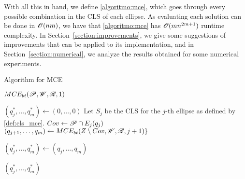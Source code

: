 With all this in hand, we define \autoref{algoritmo:mce}, which goes through every possible combination in the CLS of each ellipse. As evaluating each solution can be done in $\mathscr{O}(nm)$, we have that \autoref{algoritmo:mce} has $\mathscr{O}(mn^{2m+1})$ runtime complexity. 
In Section~\ref{section:improvements}, we give some suggestions of improvements that can be applied to its implementation, and in Section~\ref{section:numerical}, we analyze the results obtained for some numerical experiments.

\begin{algorithm}
	\caption{Algorithm for MCE}\label{algoritmo:mce}
	
	\begin{algorithmic}[1]
		
		
		\item[]
		\State \Return $MCE_{bt}(\mathscr{P}, \mathscr{W}, \mathscr{R}, 1)$
		\EndProcedure
		
		\item[]
		
		\State $(q_j^*, \dots, q_m^*) \gets (0, \dots, 0)$
		\State Let $S_j$ be the CLS for the $j$-th ellipse as defined by \autoref{def:cls_mce}.
			\State $Cov \gets \mathscr{P} \cap E_j(q_j)$
				\State $(q_{j+1}, \dots, q_m) \gets MCE_{bt}(Z \setminus Cov, \mathscr{W}, \mathscr{R}, j+1)\}$
			\EndIf
			
			\State $(q_j^*, \dots, q_m^*) \gets(q_j, \dots, q_m)$
			\EndIf
		\EndFor
		
		\State \Return $(q_j^*, \dots, q_m^*)$
		\EndProcedure
	\end{algorithmic}
\end{algorithm}
